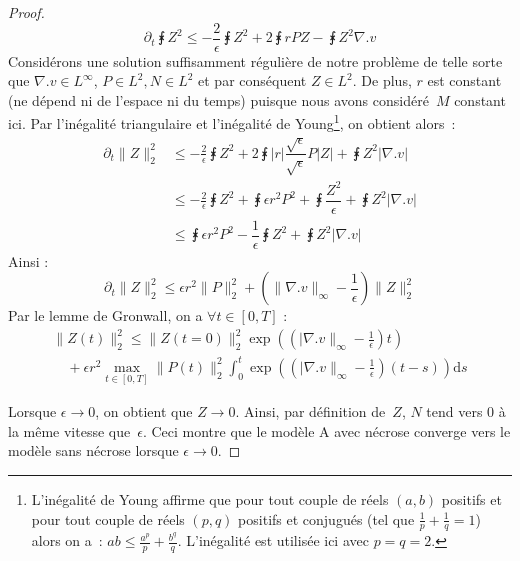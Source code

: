 \documentclass[main.tex]{subfiles}
\begin{document}
\begin{proof}
\begin{equation}
 \partial_t \intx Z^2 \leq - \frac{2}{\epsilon} \intx Z^2 + 2 \intx rPZ - \intx Z^2 \nabla.v
\end{equation}
Considérons une solution suffisamment régulière de notre problème de telle sorte que $\nabla.v \in L^\infty$, $P \in L^2, N \in L^2$ et par conséquent $Z \in L^2$. De plus, $r$ est constant (\ie ne dépend ni de l'espace ni du temps) puisque nous avons considéré~$M$ constant ici. Par l'inégalité triangulaire et l'inégalité de Young\footnote{L'inégalité de Young affirme que pour tout couple de réels $(a,b)$ positifs et pour tout couple de réels $(p,q)$ positifs et conjugués (\ie tel que $\frac{1}{p}+\frac{1}{q}=1$) alors on a~: $ab \leq \frac{a^p}{p} + \frac{b^q}{q}$. L'inégalité est utilisée ici avec $p=q=2$. }, 
on obtient alors~:
\begin{align*}
\partial_t \| Z \|^2_2 & \leq -\frac{2}{\epsilon} \intx Z^2 + 2 \intx  |r| \dfrac{\sqrt{\epsilon}}{\sqrt{\epsilon}} P|Z| + \intx Z^2 | \nabla.v | \\
& \leq -\frac{2}{\epsilon} \intx Z^2 + \intx \epsilon r^2 P^2 + \intx \dfrac{Z^2}{\epsilon}  + \intx Z^2 | \nabla.v | \\
& \leq \intx \epsilon r^2 P^2 - \dfrac{1}{\epsilon} \intx Z^2  + \intx Z^2 | \nabla.v | 
\end{align*}
Ainsi :
\begin{equation}
\partial_t \|Z\|_2^2 \leq \epsilon r^2 \|P\|_2^2 + \left( \|\nabla.v\|_\infty - \frac{1}{\epsilon} \right) \| Z \|^2_2
\end{equation}
Par le lemme de Gronwall, on a $\forall t\in [0,T]$ :
\begin{equation}
\begin{array}{l}
\displaystyle \|Z(t)\|^2_2 \leq \|Z(t=0)\|_2^2 \exp \left(  \left(  |\nabla.v\|_\infty - \frac{1}{\epsilon} \right) t\right) \\
\displaystyle \quad + \epsilon r^2 \max_{t\in[0,T]} \| P(t) \|^2_2 \int_0^t \exp \left(  \left(  |\nabla.v\|_\infty - \frac{1}{\epsilon} \right) (t-s) \right) \textrm{d}s
\end{array}
\end{equation}

Lorsque $\epsilon \to 0$, on obtient que $Z \to 0$. Ainsi, par définition de~$Z$, $N$ tend vers 0 à la même vitesse que~$\epsilon$. Ceci montre que le modèle A avec nécrose converge vers le modèle sans nécrose lorsque $\epsilon \to 0$. 
\end{proof}
\end{document}
